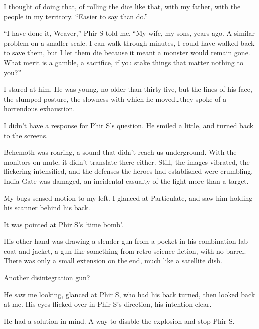 I thought of doing that, of rolling the dice like that, with my father, with the people in my territory.  ``Easier to say than do.''



``I have done it, Weaver,'' Phir S told me.  ``My wife, my sons, years ago.  A similar problem on a smaller scale.  I can walk through minutes, I could have walked back to save them, but I let them die because it meant a monster would remain gone.  What merit is a gamble, a sacrifice, if you stake things that matter nothing to you?''



I stared at him.  He was young, no older than thirty-five, but the lines of his face, the slumped posture, the slowness with which he moved\ldots they spoke of a horrendous exhaustion.



I didn't have a response for Phir S's question.  He smiled a little, and turned back to the screens.



Behemoth was roaring, a sound that didn't reach us underground.  With the monitors on mute, it didn't translate there either.  Still, the images vibrated, the flickering intensified, and the defenses the heroes had established were crumbling.  India Gate was damaged, an incidental casualty of the fight more than a target.



My bugs sensed motion to my left.  I glanced at Particulate, and saw him holding his scanner behind his back.



It was pointed at Phir S's `time bomb'.



His other hand was drawing a slender gun from a pocket in his combination lab coat and jacket, a gun like something from retro science fiction, with no barrel.  There was only a small extension on the end, much like a satellite dish.



Another disintegration gun?



He saw me looking, glanced at Phir S, who had his back turned, then looked back at me.  His eyes flicked over in Phir S's direction, his intention clear.



He had a solution in mind.  A way to disable the explosion and stop Phir S.



